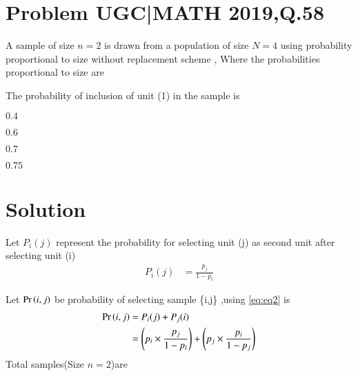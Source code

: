 \documentclass[journal,12pt,twocolumn]{IEEEtran}
\begin{document}
\section{ Problem UGC|MATH 2019,Q.58}
A sample of size $n =2$ is drawn from a population of size $N=4$ using probability proportional to size without replacement scheme , Where the probabilities proportional to size are

\begin{table}[h!]
   \caption*{Table : Probability vs Size}
\end{table}  
The probability of inclusion of unit (1) in the sample is 

\begin{enumerate}
\begin{multicols}{4}
\setlength\itemsep{2em}
\item $0.4$
\item $0.6$
\item $0.7$
\item $0.75$
\end{multicols}
\end{enumerate}

\section{Solution }
Let $P_{i}(j)$ represent the probability for selecting unit (j) as second unit after selecting  unit (i) 
\begin{align}
    P_{i}(j)&=\frac{p_{j}}{1-p_{i}}
    \label{eq:eq2}
\end{align}

Let  $\Pr\left(i,j\right)$ be probability of selecting sample \{i,j\} ,using \eqref{eq:eq2}  is 
\begin{align}
    \Pr\left(i,j\right)&=P_{i}(j)+P_{j}(i)
    \\
    &=\left(p_{i}\times \frac{p_{j}}{1-p_{i}}\right) + \left(p_{j}\times \frac{p_{i}}{1-p_{j}}\right)
    \label{eq:eq3}
\end{align}
Total samples(Size $n=2$)are 
\end{document}
